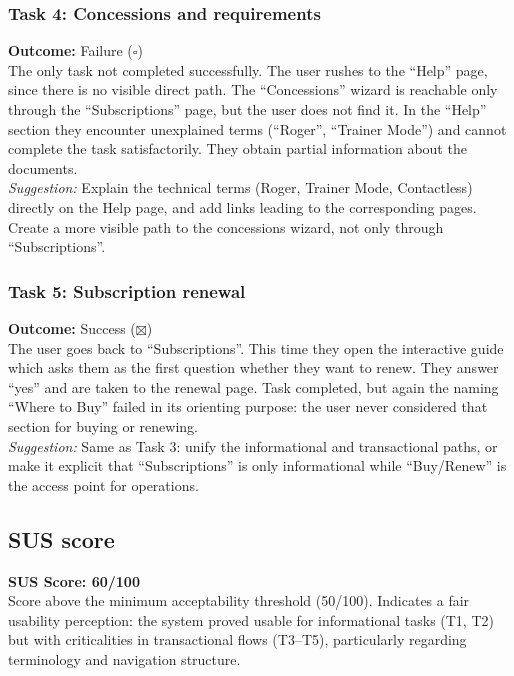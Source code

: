 ﻿\documentclass[11pt,a4paper]{article}
\begin{document}
\begin{tcolorbox}[base]
\vspace{0.3cm}

\subsubsection*{Task 4: Concessions and requirements}
\noindent\textbf{Outcome:} Failure ($\square$)\\[0.2cm]
The only task not completed successfully. The user
rushes to the ``Help'' page, since there is no visible
direct path. The ``Concessions'' wizard is reachable
only through the ``Subscriptions'' page, but the user does not
find it. In the ``Help'' section they encounter unexplained
terms (``Roger'', ``Trainer Mode'') and cannot
complete the task satisfactorily. They obtain
partial information about the documents.\\[0.2cm]
\textit{Suggestion:} Explain the technical terms (Roger,
Trainer Mode, Contactless) directly on the Help page,
and add links leading to the corresponding pages.
Create a more visible path to the concessions wizard,
not only through ``Subscriptions''.

\vspace{0.3cm}

\subsubsection*{Task 5: Subscription renewal}
\noindent\textbf{Outcome:} Success ($\boxtimes$)\\[0.2cm]
The user goes back to ``Subscriptions''. This time they open the
interactive guide which asks them as the first question whether they
want to renew. They answer ``yes'' and are taken to the renewal
page. Task completed, but again the naming
``Where to Buy'' failed in its orienting purpose:
the user never considered that section for buying
or renewing.\\[0.2cm]
\textit{Suggestion:} Same as Task 3: unify the
informational and transactional paths, or make it explicit
that ``Subscriptions'' is only informational while ``Buy/Renew''
is the access point for operations.

\end{tcolorbox}

\subsection*{SUS score}
\begin{tcolorbox}[base]
\textbf{SUS Score: 60/100}\\[0.2cm]
\small Score above the minimum acceptability
threshold (50/100). Indicates a fair usability
perception: the system proved usable for informational
tasks (T1, T2) but with criticalities in transactional
flows (T3--T5), particularly regarding terminology
and navigation structure.
\end{tcolorbox}
\end{document}

